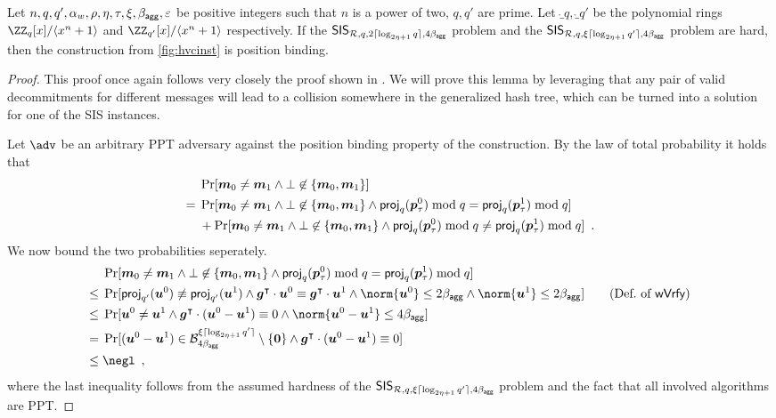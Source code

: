 \begin{lemma}\label{lem:hvcposbind}
  Let $n,q,q',\alpha_w,\rho,\eta,\tau,\xi,\beta_{\mathsf{agg}},\varepsilon$ be positive integers such that $n$ is a power of two, $q,q'$ are prime.
  Let $\ring_q,\ring_{q'}$ be the polynomial rings $\ZZ_q[x]/\langle x^n+1\rangle$ and $\ZZ_{q'}[x]/\langle x^n+1\rangle$ respectively.
  If the $\mathsf{SIS}_{\mathcal{R},q,2\lceil \log_{2\eta+1} q \rceil,4\beta_{\mathsf{agg}}}$ problem and the $\mathsf{SIS}_{\mathcal{R},q,\xi\lceil \log_{2\eta+1} q' \rceil,4\beta_{\mathsf{agg}}}$ problem are hard, then the construction from \autoref{fig:hvcinst} is position binding.
\end{lemma}
\begin{proof}
This proof once again follows very closely the proof shown in \cite{CCS:FleSimZha22}.
We will prove this lemma by leveraging that any pair of valid decommitments for different messages will lead to a collision somewhere in the generalized hash tree, which can be turned into a solution for one of the SIS instances. 

  Let $\adv$ be an arbitrary PPT adversary against the position binding property of the construction.
%  
  By the law of total probability it holds that
  \begin{align*}
    &\Pr[\boldsymbol{m}_0\neq \boldsymbol{m}_1 \land \bot\not\in\{\boldsymbol{m}_0,\boldsymbol{m}_1\}]\\
    ={}& \Pr[\boldsymbol{m}_0\neq \boldsymbol{m}_1 \land \bot\not\in\{\boldsymbol{m}_0,\boldsymbol{m}_1\} \land \mathsf{proj}_q(\boldsymbol{p}_\tau^0)\bmod q  = \mathsf{proj}_q(\boldsymbol{p}_\tau^1)\bmod q]\\& 
    +
    \Pr[\boldsymbol{m}_0\neq \boldsymbol{m}_1 \land \bot\not\in\{\boldsymbol{m}_0,\boldsymbol{m}_1\} \land \mathsf{proj}_q(\boldsymbol{p}_\tau^0)\bmod q \neq \mathsf{proj}_q(\boldsymbol{p}_\tau^1)\bmod q]\enspace.
  \end{align*}
%
  We now bound the two probabilities seperately.
%  
  \begin{align*}
    &\Pr[\vec{m}_0\neq \vec{m}_1 \land \bot\not\in\{\vec{m}_0,\vec{m}_1\} \land \proj_q(\vec{p}_\tau^0)\bmod q = \proj_q(\vec{p}_\tau^1)\bmod q]\\
    \leq{}&\Pr[\proj_{q'}(\vec{u}^0) \not \equiv \proj_{q'}(\vec{u}^1) \land \vec{g}^\transpose\cdot \vec{u}^0 \equiv \vec{g}^\transpose\cdot \vec{u}^1 \land \norm{\vec{u}^0}\leq 2\bagg \land \norm{\vec{u}^1}\leq 2\bagg]\tag{Def.\ of $\wverify$}\\
    \leq{}& \Pr[\vec{u}^0 \neq \vec{u}^1 \land \vec{g}^\transpose\cdot (\vec{u}^0-\vec{u}^1) \equiv 0 \land \norm{\vec{u}^0-\vec{u}^1}\leq 4\bagg]\\
    = {}& \Pr[(\vec{u}^0-\vec{u}^1) \in \ball_{4\bagg}^{\xi\lceil\log_{2\eta+1}q'\rceil}\setminus \{\vec{0}\} \land \vec{g}^\transpose\cdot (\vec{u}^0-\vec{u}^1) \equiv 0]\\
    \leq{}& \negl\enspace,
  \end{align*}
  where the last inequality follows from the assumed hardness of the $\mathsf{SIS}_{\mathcal{R},q,\xi\lceil \log_{2\eta+1} q'\rceil,4\beta_{\mathsf{agg}}}$ problem and the fact that all involved algorithms are PPT.
  

\end{proof}

